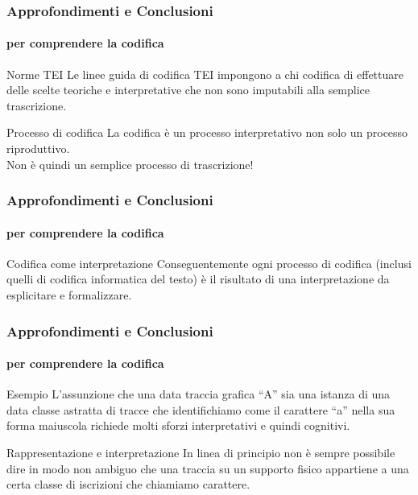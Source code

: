 \begin{frame}
	\frametitle{Approfondimenti e Conclusioni}
	\framesubtitle{per comprendere la codifica}
	\addtocounter{nframe}{1}

	\begin{block}{Norme TEI}
		Le linee guida di codifica TEI impongono a chi codifica di effettuare delle scelte teoriche e interpretative che non sono imputabili alla semplice trascrizione.
    \end{block}
    
    \begin{block}{Processo di codifica}
        La codifica è un processo interpretativo non solo un processo riproduttivo.
        \\Non è quindi un semplice processo di trascrizione!
    \end{block}
    

\end{frame}


\begin{frame}
	\frametitle{Approfondimenti e Conclusioni}
	\framesubtitle{per comprendere la codifica}
	\addtocounter{nframe}{1}

	\begin{block}{Codifica come interpretazione}
		Conseguentemente ogni processo di codifica (inclusi quelli di codifica informatica del testo) è il risultato di una interpretazione da esplicitare e formalizzare.
    \end{block}
   
\end{frame}

\begin{frame}
	\frametitle{Approfondimenti e Conclusioni}
	\framesubtitle{per comprendere la codifica}
	\addtocounter{nframe}{1}

	\begin{block}{Esempio}
		L’assunzione che una data traccia grafica ``A'' sia una istanza di una data classe astratta di tracce che identifichiamo come il carattere ``a'' nella sua forma maiuscola richiede molti sforzi interpretativi e quindi cognitivi.
    \end{block}
    
    \begin{block}{Rappresentazione e interpretazione}
        In linea di principio non è sempre possibile dire in modo non ambiguo che una traccia su un supporto fisico appartiene a una certa classe di iscrizioni che chiamiamo carattere.
    \end{block}

\end{frame}



